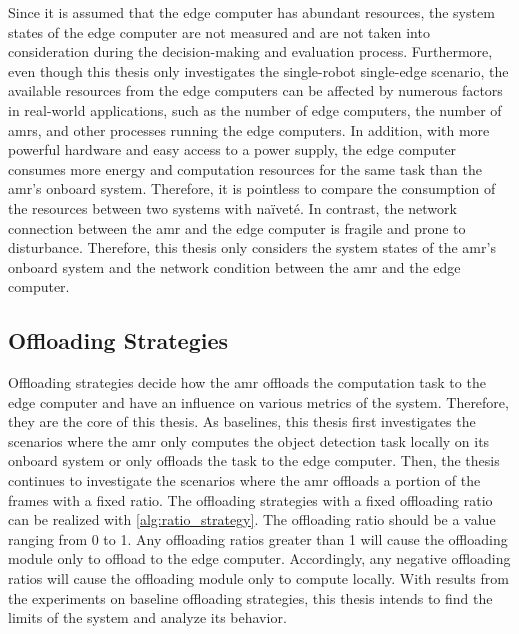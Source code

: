 Since it is assumed that the edge computer has abundant resources, the system states of the edge computer are not measured and are not taken into consideration during the decision-making and evaluation process. Furthermore, even though this thesis only investigates the single-robot single-edge scenario, the available resources from the edge computers can be affected by numerous factors in real-world applications, such as the number of edge computers, the number of \glspl{amr}, and other processes running the edge computers. In addition, with more powerful hardware and easy access to a power supply, the edge computer consumes more energy and computation resources for the same task than the \gls{amr}'s onboard system. Therefore, it is pointless to compare the consumption of the resources between two systems with na\"{i}vet\'{e}. In contrast, the network connection between the \gls{amr} and the edge computer is fragile and prone to disturbance. Therefore, this thesis only considers the system states of the \gls{amr}'s onboard system and the network condition between the \gls{amr} and the edge computer. 

\subsection{Offloading Strategies}\label{sec:general_setup:offloading_strategies}

Offloading strategies decide how the \gls{amr} offloads the computation task to the edge computer and have an influence on various metrics of the system. Therefore, they are the core of this thesis. As baselines, this thesis first investigates the scenarios where the \gls{amr} only computes the object detection task locally on its onboard system or only offloads the task to the edge computer. Then, the thesis continues to investigate the scenarios where the \gls{amr} offloads a portion of the frames with a fixed ratio. The offloading strategies with a fixed offloading ratio can be realized with \cref{alg:ratio_strategy}. The offloading ratio should be a value ranging from 0 to 1. Any offloading ratios greater than 1 will cause the offloading module only to offload to the edge computer. Accordingly, any negative offloading ratios will cause the offloading module only to compute locally. With results from the experiments on baseline offloading strategies, this thesis intends to find the limits of the system and analyze its behavior. 


